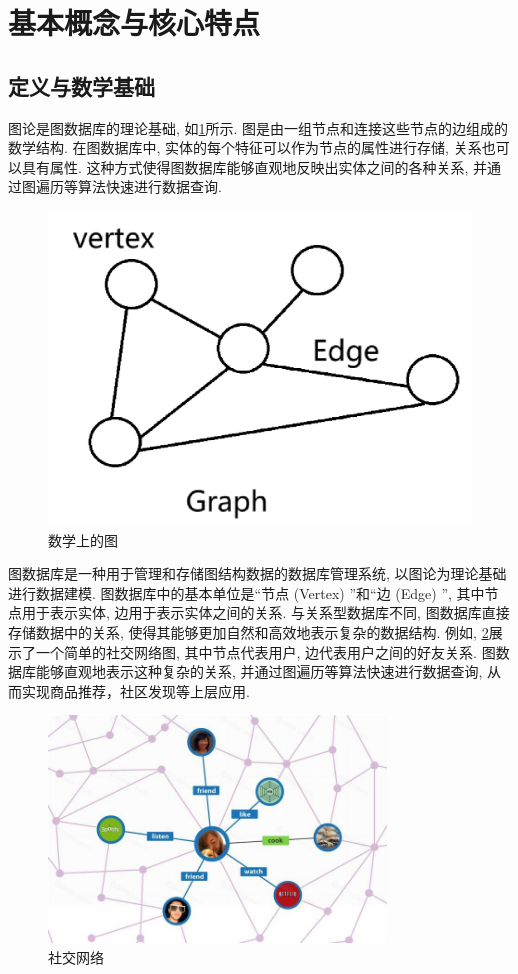 \section{基本概念与核心特点}

\subsection{定义与数学基础}
图论是图数据库的理论基础, 如\cref{fig:graph}所示. 图是由一组节点和连接这些节点的边组成的数学结构. 在图数据库中, 实体的每个特征可以作为节点的属性进行存储, 关系也可以具有属性. 这种方式使得图数据库能够直观地反映出实体之间的各种关系, 并通过图遍历等算法快速进行数据查询.

\begin{figure}[H]
	\centering
	\includegraphics[width=1\textwidth]{images/7.png}
	\caption{数学上的图}
	\label{fig:graph}
\end{figure}
图数据库是一种用于管理和存储图结构数据的数据库管理系统, 以图论为理论基础进行数据建模. 图数据库中的基本单位是“节点 (Vertex) ”和“边 (Edge) ”, 其中节点用于表示实体, 边用于表示实体之间的关系. 与关系型数据库不同, 图数据库直接存储数据中的关系, 使得其能够更加自然和高效地表示复杂的数据结构. 例如, \cref{fig:social-network}展示了一个简单的社交网络图, 其中节点代表用户, 边代表用户之间的好友关系. 图数据库能够直观地表示这种复杂的关系, 并通过图遍历等算法快速进行数据查询, 从而实现商品推荐，社区发现等上层应用.
\begin{figure}[H]
	\centering
	\includegraphics[width=0.8\textwidth]{images/8.png}
	\caption{社交网络}
	\label{fig:social-network}
\end{figure}


